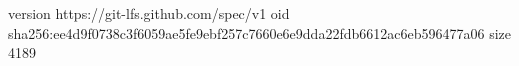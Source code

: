 version https://git-lfs.github.com/spec/v1
oid sha256:ee4d9f0738c3f6059ae5fe9ebf257c7660e6e9dda22fdb6612ac6eb596477a06
size 4189
